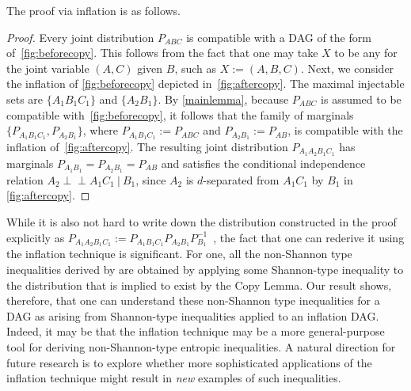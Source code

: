 \documentclass[aps,english,superscriptaddress,onecolumn,twoside,longbibliography,pra,floatfix,fleqn,nofootinbib]{revtex4-1}%
\newcommand*{\tblue}[1]{{\color{MidnightBlue}{\textbf{#1}}}}
\theoremstyle{definition}
\newcounter{example}[section]
\newcommand{\indep}{\perp\!\!\!\!\perp} %
\begin{document}
The proof via inflation is as follows.
\begin{proof}
Every joint distribution $P_{ABC}$ is compatible with a DAG of the form of~\cref{fig:beforecopy}.  This follows from the fact that one may take $X$ to be any \tblue{sufficient statistic} for the joint variable $(A,C)$ given $B$, such as $X := (A,B,C)$.  Next, we consider the inflation of \cref{fig:beforecopy} depicted in~\cref{fig:aftercopy}. The maximal injectable sets are $\{ A_1 B_1 C_1\}$ and $\{A_2 B_1\}$.  By \cref{mainlemma}, because $P_{ABC}$ is assumed to be compatible with~\cref{fig:beforecopy}, it follows that the family of marginals $\{ P_{A_1 B_1 C_1}, P_{A_2 B_1}\}$, where $P_{A_1 B_1 C_1}:= P_{A B C}$ and $P_{A_2 B_1} := P_{AB}$, is compatible with the inflation of~\cref{fig:aftercopy}. The resulting joint distribution $P_{A_1 A_2 B_1 C_1}$ has marginals $P_{A_1 B_1}= P_{A_2 B_1} =P_{AB}$ and satisfies the conditional independence relation $A_2 \indep A_1 C_1 \:|\: B_1$, since $A_2$ is $d$-separated from $A_1 C_1$ by $B_1$ in \cref{fig:aftercopy}.
\end{proof}

While it is also not hard to write down the distribution constructed in the proof explicitly as $P_{A_1 A_2 B_1 C_1} := P_{A_1 B_1 C_1} P_{A_2 B_1} P_{B_1}^{-1}$~\cite[Lemma~15.8]{yeung_network_2008}, the fact that one can rederive it using the inflation technique is significant.  For one, all the non-Shannon type inequalities derived by \citet{zeger_2011_nonshannon} are obtained by applying some Shannon-type inequality to the distribution that is implied to exist by the Copy Lemma.  Our result shows, therefore, that one can understand these non-Shannon type inequalities for a DAG as arising from Shannon-type inequalities applied to an inflation DAG.  Indeed, it may be that the inflation technique may be a more general-purpose tool for deriving non-Shannon-type entropic inequalities.  A natural direction for future research is to explore whether more sophisticated applications of the inflation technique might result  in \emph{new} examples of such inequalities. 
\end{document}

